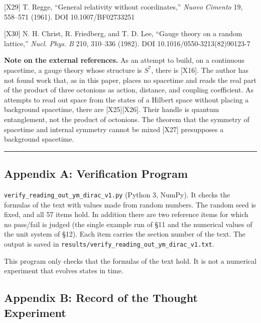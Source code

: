 \documentclass[
  a4paper,
]{article}
\begin{document}
{[}X29{]} T. Regge, ``General relativity without coordinates,''
\emph{Nuovo Cimento} 19, 558--571 (1961). DOI 10.1007/BF02733251

{[}X30{]} N. H. Christ, R. Friedberg, and T. D. Lee, ``Gauge theory on a
random lattice,'' \emph{Nucl. Phys. B} 210, 310--336 (1982). DOI
10.1016/0550-3213(82)90123-7

\textbf{Note on the external references.} As an attempt to build, on a
continuous spacetime, a gauge theory whose structure is \(S^7\), there
is {[}X16{]}. The author has not found work that, as in this paper,
places no spacetime and reads the real part of the product of three
octonions as action, distance, and coupling coefficient. As attempts to
read out space from the states of a Hilbert space without placing a
background spacetime, there are {[}X25{]}{[}X26{]}. Their handle is
quantum entanglement, not the product of octonions. The theorem that the
symmetry of spacetime and internal symmetry cannot be mixed {[}X27{]}
presupposes a background spacetime.

\begin{center}\rule{0.5\linewidth}{0.5pt}\end{center}

\subsection{Appendix A: Verification
Program}\label{appendix-a-verification-program}

\texttt{verify\_\allowbreak{}reading\_\allowbreak{}out\_\allowbreak{}ym\_\allowbreak{}dirac\_\allowbreak{}v1.py} (Python 3, NumPy). It
checks the formulas of the text with values made from random numbers.
The random seed is fixed, and all 57 items hold. In addition there are
two reference items for which no pass/fail is judged (the single example
run of §11 and the numerical values of the unit system of §12). Each
item carries the section number of the text. The output is saved in
\texttt{results/\allowbreak{}verify\_\allowbreak{}reading\_\allowbreak{}out\_\allowbreak{}ym\_\allowbreak{}dirac\_\allowbreak{}v1.txt}.

This program only checks that the formulas of the text hold. It is not a
numerical experiment that evolves states in time.

\subsection{Appendix B: Record of the Thought
Experiment}\label{appendix-b-record-of-the-thought-experiment}
\end{document}
